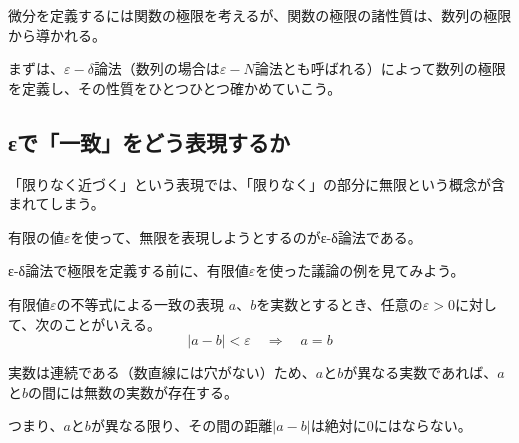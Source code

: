 \documentclass[../math-imaging]{subfiles}
\begin{document}
微分を定義するには関数の極限を考えるが、関数の極限の諸性質は、数列の極限から導かれる。

まずは、$\varepsilon - \delta $論法（数列の場合は$\varepsilon - N$論法とも呼ばれる）によって数列の極限を定義し、その性質をひとつひとつ確かめていこう。

\subsection{εで「一致」をどう表現するか}

「限りなく近づく」という表現では、「限りなく」の部分に無限という概念が含まれてしまう。

有限の値$\varepsilon$を使って、無限を表現しようとするのがε-δ論法である。

\froufrou

ε-δ論法で極限を定義する前に、有限値$\varepsilon$を使った議論の例を見てみよう。

\begin{theorem}{有限値$\varepsilon $の不等式による一致の表現}
  \newline
  $a$、$b$を実数とするとき、任意の$\varepsilon >0$に対して、次のことがいえる。
  \LARGE
  \begin{equation}
    |a-b|<\varepsilon \quad \Longrightarrow  \quad a=b
  \end{equation}
\end{theorem}

実数は連続である（数直線には穴がない）ため、$a$と$b$が異なる実数であれば、$a$と$b$の間には無数の実数が存在する。

つまり、$a$と$b$が異なる限り、その間の距離$|a-b|$は絶対に$0$にはならない。
\end{document}
